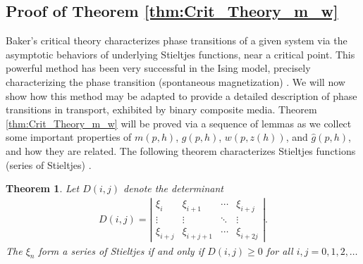 \documentclass[english,12pt,jmp,graphicx]{revtex4-1}
\newtheorem{theorem}{Theorem}[section]
\newtheorem{definition}{Definition}[section]
\newcommand{\ph}{\hat{\phi}}
\begin{document}
\subsection{Proof of Theorem
  \ref{thm:Crit_Theory_m_w}} \label{sec:Proof_of_Theorem}
%
Baker's critical theory characterizes phase transitions of a given system
via the asymptotic behaviors of underlying Stieltjes functions, near a
critical point. This powerful method has been very successful in the
Ising model, precisely characterizing the phase transition
(spontaneous magnetization) \cite{Baker-1990}.
We will now show how this method may be adapted to provide a detailed
description of phase transitions in transport, exhibited by binary
composite media. Theorem \ref{thm:Crit_Theory_m_w} will be proved via
a sequence of lemmas as we collect some important properties of
$m(p,h)$, $g(p,h)$, $w(p,z(h))$, and $\hat{g}(p,h)$, and how they are related.   
%
%
The following theorem
characterizes Stieltjes functions (series of Stieltjes) \cite{Baker-1990}.  
% 
\begin{theorem} \label{thm:stieltjes_Characterization}
   Let $D(i,j)$ denote the determinant
    \begin{align} \label{eq:Detf} 
     D(i,j) = \left|
                 \begin{matrix}
                   \xi_i&\xi_{i+1}&\cdots&\xi_{i+j}\\ 
                   \vdots&\vdots&\ddots&\vdots\\
                   \xi_{i+j}&\xi_{i+j+1}&\cdots&\xi_{i+2j}                            
                   \end{matrix}
              \right| .
   \end{align}
   The $\xi_n$ form a series of Stieltjes if and only if
   $D(i,j) \geq 0$ for all $i,j =0,1,2,\ldots$ 

 \end{theorem} 
\end{document}
